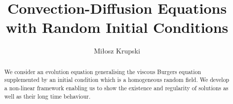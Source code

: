 \documentclass[a4paper,10pt,fleqn]{amsart}
\theoremstyle{remark}
\theoremstyle{definition}
\renewcommand{\=} {\overset{d}{=}}
\begin{document}
\title[]{Convection-Diffusion Equations with Random Initial Conditions}
\author{Mi\l{}osz Krupski}
\address{Uniwersytet Wroc\l{}awski, Instytut Matematyczny\\ pl. Grunwaldzki 2/4, 50-384 Wroc\l{}aw}
 

  \begin{abstract}
We consider an evolution equation generalising the viscous Burgers equation
supplemented by an initial condition which is a homogeneous random field.
We develop a non-linear framework enabling us to show the existence
and regularity of solutions as well as their long time behaviour.
  \end{abstract}
\maketitle
\end{document}
